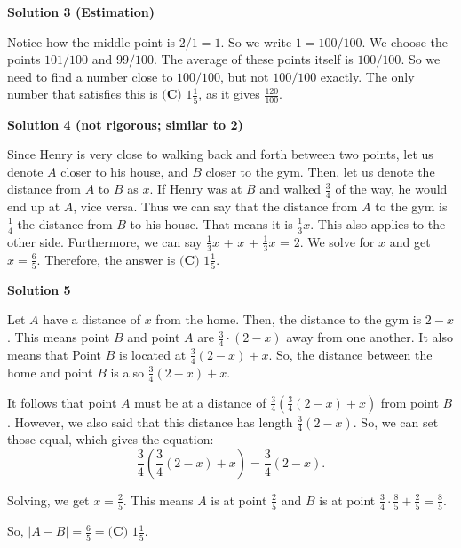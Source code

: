 \begin{enumerate}
 



\textbf{Solution 3 (Estimation)}

Notice how the middle point is \( 2/1 = 1 \). So we write \( 1 = 100/100 \). We choose the points \( 101/100 \) and \( 99/100 \). The average of these points itself is \( 100/100 \). So we need to find a number close to \(100/100\), but not \(100/100\) exactly. The only number that satisfies this is $\boxed{\textbf{(C) } 1 \frac{1}{5}}$, as it gives \( \frac{120}{100} \).

 



\textbf{Solution 4 (not rigorous; similar to 2)}

Since Henry is very close to walking back and forth between two points, let us denote $A$ closer to his house, and $B$ closer to the gym. Then, let us denote the distance from $A$ to $B$ as $x$. If Henry was at $B$ and walked $\frac{3}{4}$ of the way, he would end up at $A$, vice versa. Thus we can say that the distance from $A$ to the gym is $\frac{1}{4}$ the distance from $B$ to his house. That means it is $\frac{1}{3}x$. This also applies to the other side. Furthermore, we can say $\frac{1}{3}x$ + $x$ + $\frac{1}{3}x$ = $2$. We solve for $x$ and get $x=\frac{6}{5}$. Therefore, the answer is $\boxed{\textbf{(C) } 1\frac{1}{5}}$.

 



\textbf{Solution 5}

Let $A$ have a distance of $x$ from the home. Then, the distance to the gym is $2-x$. This means point $B$ and point $A$ are $\frac{3}{4} \cdot (2-x)$ away from one another. It also means that Point $B$ is located at $\frac{3}{4} (2-x) + x.$ So, the distance between the home and point $B$ is also $\frac{3}{4} (2-x) + x.$

 It follows that point $A$ must be at a distance of $\frac{3}{4} \left( \frac{3}{4} (2-x) + x \right)$ from point $B$. However, we also said that this distance has length $\frac{3}{4} (2-x)$. So, we can set those equal, which gives the equation: 
 \[\frac{3}{4} \left( \frac{3}{4} (2-x) + x \right) = \frac{3}{4} (2-x).\]

 Solving, we get $x = \frac{2}{5}$. This means $A$ is at point $\frac{2}{5}$ and $B$ is at point $\frac{3}{4} \cdot \frac{8}{5} + \frac{2}{5} = \frac{8}{5}.$

 So, $|A - B| = \frac{6}{5}=\boxed{\textbf{(C) } 1\frac{1}{5}}.$





\end{enumerate}
